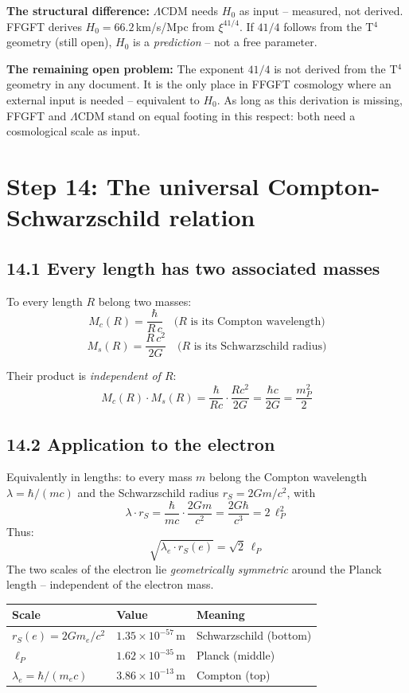 \textbf{The structural difference:}
$\Lambda$CDM needs $H_0$ as input -- measured, not derived.
FFGFT derives $H_0 = 66{.}2$\,km/s/Mpc from $\xi^{41/4}$.
If $41/4$ follows from the T$^4$ geometry (still open),
$H_0$ is a \emph{prediction} -- not a free parameter.

\textbf{The remaining open problem:}
The exponent $41/4$ is not derived from the T$^4$ geometry in any
document. It is the only place in FFGFT cosmology where an external
input is needed -- equivalent to $H_0$.
As long as this derivation is missing, FFGFT and $\Lambda$CDM stand
on equal footing in this respect: both need a cosmological scale
as input.

\section{Step 14: The universal Compton-Schwarzschild relation}

\subsection*{14.1 Every length has two associated masses}

To every length $R$ belong two masses:
\[
  M_c(R) = \frac{\hbar}{R\,c}
  \quad\text{(}R\text{ is its Compton wavelength)}
\]
\[
  M_s(R) = \frac{R\,c^2}{2G}
  \quad\text{(}R\text{ is its Schwarzschild radius)}
\]

Their product is \emph{independent of $R$}:
\[
  \boxed{M_c(R)\cdot M_s(R)
  = \frac{\hbar}{Rc}\cdot\frac{Rc^2}{2G}
  = \frac{\hbar c}{2G}
  = \frac{m_P^2}{2}}
\]

\subsection*{14.2 Application to the electron}

Equivalently in lengths: to every mass $m$ belong the Compton
wavelength $\lambda = \hbar/(mc)$ and the Schwarzschild radius
$r_S = 2Gm/c^2$, with
\[
  \lambda \cdot r_S = \frac{\hbar}{mc}\cdot\frac{2Gm}{c^2}
  = \frac{2G\hbar}{c^3} = 2\,\ell_P^2
\]
Thus:
\[
  \sqrt{\lambda_e \cdot r_S(e)} = \sqrt{2}\,\ell_P
\]
The two scales of the electron lie \emph{geometrically symmetric}
around the Planck length -- independent of the electron mass.

\begin{center}
\begin{tabular}{lll}
\toprule
\textbf{Scale} & \textbf{Value} & \textbf{Meaning} \\
\midrule
$r_S(e) = 2Gm_e/c^2$ & $1{.}35\times10^{-57}$\,m & Schwarzschild (bottom) \\
$\ell_P$ & $1{.}62\times10^{-35}$\,m & Planck (middle) \\
$\lambda_e = \hbar/(m_e c)$ & $3{.}86\times10^{-13}$\,m & Compton (top) \\
\bottomrule
\end{tabular}
\end{center}

